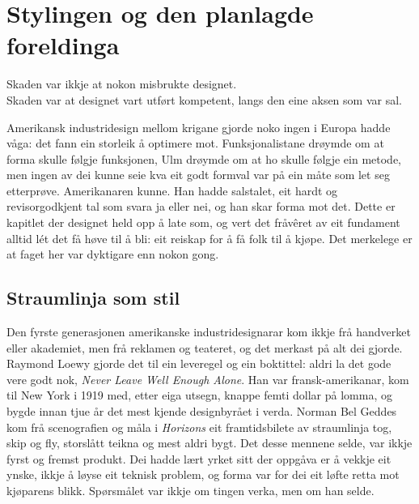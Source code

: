 \chapter{Stylingen og den planlagde foreldinga}

\begin{motto}
Skaden var ikkje at nokon misbrukte designet.\\ Skaden var at designet vart utført kompetent, langs den eine aksen som var sal.
\end{motto}

Amerikansk industridesign mellom krigane gjorde noko ingen i Europa hadde våga: det fann ein storleik å optimere mot. Funksjonalistane drøymde om at forma skulle følgje funksjonen, Ulm drøymde om at ho skulle følgje ein metode, men ingen av dei kunne seie kva eit godt formval var på ein måte som let seg etterprøve. Amerikanaren kunne. Han hadde salstalet, eit hardt og revisorgodkjent tal som svara ja eller nei, og han skar forma mot det. Dette er kapitlet der designet held opp å late som, og vert det fråvêret av eit fundament alltid lét det få høve til å bli: eit reiskap for å få folk til å kjøpe. Det merkelege er at faget her var dyktigare enn nokon gong.


\section{Straumlinja som stil}

Den fyrste generasjonen amerikanske industridesignarar kom ikkje frå handverket eller akademiet, men frå reklamen og teateret, og det merkast på alt dei gjorde. Raymond Loewy gjorde det til ein leveregel og ein boktittel: aldri la det gode vere godt nok, \emph{Never Leave Well Enough Alone}\autocite{loewy1951}. Han var fransk-amerikanar, kom til New York i 1919 med, etter eiga utsegn, knappe femti dollar på lomma, og bygde innan tjue år det mest kjende designbyrået i verda. Norman Bel Geddes kom frå scenografien og måla i \emph{Horizons} eit framtidsbilete av straumlinja tog, skip og fly, storslått teikna og mest aldri bygt\autocite{geddes1932horizons}. Det desse mennene selde, var ikkje fyrst og fremst produkt. Dei hadde lært yrket sitt der oppgåva er å vekkje eit ynske, ikkje å løyse eit teknisk problem, og forma var for dei eit løfte retta mot kjøparens blikk. Spørsmålet var ikkje om tingen verka, men om han selde.

